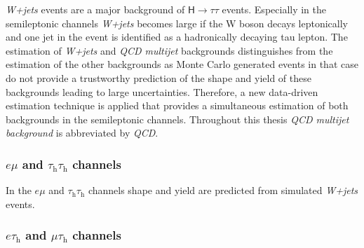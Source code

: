 \textit{W+jets} events are a major background of $\mathsf{H\rightarrow \tau\tau}$ events. Especially in the semileptonic channels \textit{W+jets} becomes large
if the W boson decays leptonically and one jet in the event is identified as a hadronically decaying tau lepton.
The estimation of \textit{W+jets} and \textit{QCD multijet} backgrounds distinguishes from the estimation of the other backgrounds as Monte Carlo 
generated events in that case do not provide a trustworthy prediction of the shape and yield of these backgrounds leading to large uncertainties.
Therefore, a new data-driven estimation technique is applied that provides 
a simultaneous estimation of both backgrounds in the semileptonic channels. 
Throughout this thesis \textit{QCD multijet background} is abbreviated by \textit{QCD}.  

\subsubsection{$e\mu$ and $\tau_\text{h}\tau_\text{h}$ channels}

In the $e\mu$ and $\tau_\text{h}\tau_\text{h}$ channels shape and yield are predicted from simulated \textit{W+jets} events.

\subsubsection{$e\tau_\text{h}$ and $\mu\tau_\text{h}$ channels}\label{sec:BackgroundEstimations:W:etmt}

